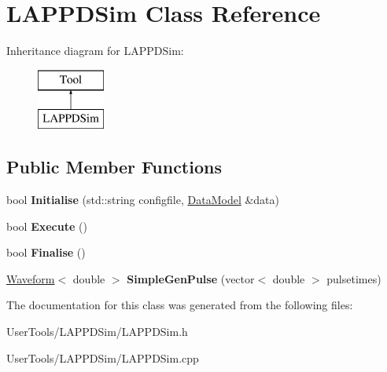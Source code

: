 \hypertarget{classLAPPDSim}{\section{L\-A\-P\-P\-D\-Sim Class Reference}
\label{classLAPPDSim}
}
Inheritance diagram for L\-A\-P\-P\-D\-Sim\-:\begin{figure}[H]
\begin{center}
\leavevmode
\includegraphics[height=2.000000cm]{classLAPPDSim}
\end{center}
\end{figure}
\subsection*{Public Member Functions}
\begin{DoxyCompactItemize}
\item 
\hypertarget{classLAPPDSim_a68edcbace6d4b83bff31e3866d0cbfc1}{bool {\bfseries Initialise} (std\-::string configfile, \hyperlink{classDataModel}{Data\-Model} \&data)}\label{classLAPPDSim_a68edcbace6d4b83bff31e3866d0cbfc1}

\item 
\hypertarget{classLAPPDSim_a0d34e153938d2a1c6fab9c3083862000}{bool {\bfseries Execute} ()}\label{classLAPPDSim_a0d34e153938d2a1c6fab9c3083862000}

\item 
\hypertarget{classLAPPDSim_a97d903656a7ddbdafb5170bb672193ba}{bool {\bfseries Finalise} ()}\label{classLAPPDSim_a97d903656a7ddbdafb5170bb672193ba}

\item 
\hypertarget{classLAPPDSim_ab08ad145a8cea2e3d0283ba48b91fa47}{\hyperlink{classWaveform}{Waveform}$<$ double $>$ {\bfseries Simple\-Gen\-Pulse} (vector$<$ double $>$ pulsetimes)}\label{classLAPPDSim_ab08ad145a8cea2e3d0283ba48b91fa47}

\end{DoxyCompactItemize}


The documentation for this class was generated from the following files\-:\begin{DoxyCompactItemize}
\item 
User\-Tools/\-L\-A\-P\-P\-D\-Sim/L\-A\-P\-P\-D\-Sim.\-h\item 
User\-Tools/\-L\-A\-P\-P\-D\-Sim/L\-A\-P\-P\-D\-Sim.\-cpp\end{DoxyCompactItemize}
